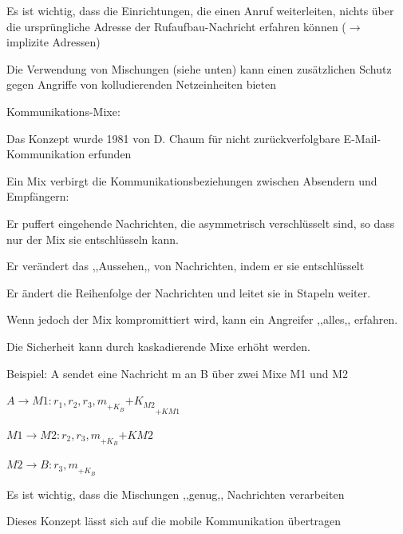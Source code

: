 \documentclass[a4paper]{article}
\begin{document}
\begin{multicols}{3}
\begin{itemize*}
\begin{itemize*}
\begin{itemize*}
                        \item Es ist wichtig, dass die Einrichtungen, die einen Anruf weiterleiten, nichts über die ursprüngliche Adresse der Rufaufbau-Nachricht erfahren können ($\rightarrow$ implizite Adressen)
                        \item Die Verwendung von Mischungen (siehe unten) kann einen zusätzlichen Schutz gegen Angriffe von kolludierenden Netzeinheiten bieten
                  \end{itemize*}
            \end{itemize*}
            \item Kommunikations-Mixe:
            \begin{itemize*}
                  \item Das Konzept wurde 1981 von D. Chaum für nicht zurückverfolgbare E-Mail-Kommunikation erfunden
                  \item Ein Mix verbirgt die Kommunikationsbeziehungen zwischen Absendern und Empfängern:
                  \begin{itemize*}
                        \item Er puffert eingehende Nachrichten, die asymmetrisch verschlüsselt sind, so dass nur der Mix sie entschlüsseln kann.
                        \item Er verändert das ,,Aussehen,, von Nachrichten, indem er sie entschlüsselt
                        \item Er ändert die Reihenfolge der Nachrichten und leitet sie in Stapeln weiter.
                        \item Wenn jedoch der Mix kompromittiert wird, kann ein Angreifer ,,alles,, erfahren.
                  \end{itemize*}
                  \item Die Sicherheit kann durch kaskadierende Mixe erhöht werden.
                  \item Beispiel: A sendet eine Nachricht m an B über zwei Mixe M1 und M2
                  \begin{itemize*}
                        \item $A\rightarrow M1: {r_1 ,{r_2 ,{r_3 , m}_{{+K_B}}}{+K_{M2}}}_{{+K}{M1}}$
                        \item $M1\rightarrow M2:{r_2 ,{r_3 , m}_{{+K_B}}}{+K{M2}}$
                        \item $M2\rightarrow B: {r_3 , m}_{+K_B}$
                        \item Es ist wichtig, dass die Mischungen ,,genug,, Nachrichten verarbeiten
                  \end{itemize*}
                  \item Dieses Konzept lässt sich auf die mobile Kommunikation übertragen
            \end{itemize*}
      \end{itemize*}


\end{multicols}
\end{document}
